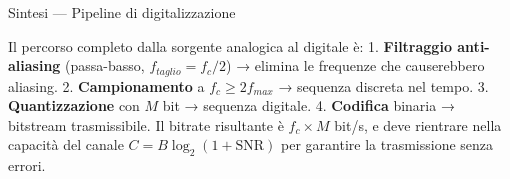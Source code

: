 \documentclass[
  italian,
  openany]{book}
\begin{document}
\begin{calloutnote}{Sintesi — Pipeline di digitalizzazione}

Il percorso completo dalla sorgente analogica al digitale è: 1.
\textbf{Filtraggio anti-aliasing} (passa-basso, \(f_{taglio} = f_c/2\))
→ elimina le frequenze che causerebbero aliasing. 2.
\textbf{Campionamento} a \(f_c \geq 2 f_{max}\) → sequenza discreta nel
tempo. 3. \textbf{Quantizzazione} con \(M\) bit → sequenza digitale. 4.
\textbf{Codifica} binaria → bitstream trasmissibile. Il bitrate
risultante è \(f_c \times M\) bit/s, e deve rientrare nella capacità del
canale \(C = B \log_2(1 + \text{SNR})\) per garantire la trasmissione
senza errori.

\end{calloutnote}

\newpage

\backmatter
\end{document}
